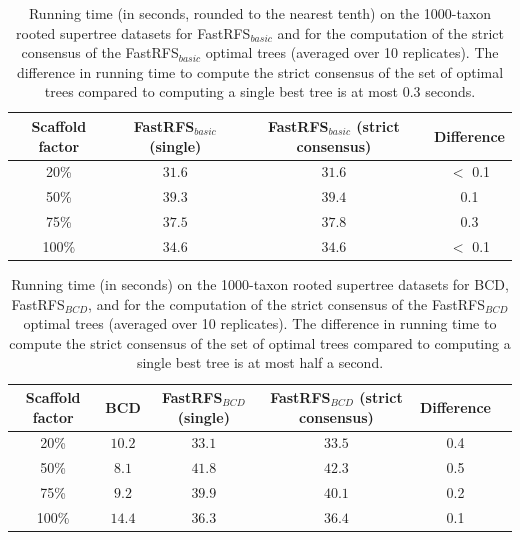 \begin{table}

\caption[Comparison of running times for FastRFS$_{basic}$ with and without SIESTA]{Running time (in seconds, rounded to the nearest tenth) on the 1000-taxon rooted supertree datasets for FastRFS$_{basic}$ and for the computation of the strict consensus of the
FastRFS$_{basic}$ optimal trees (averaged over 10 replicates).  The difference in running time to compute the strict consensus of the set of optimal trees compared to computing a single best tree is at most $0.3$ seconds. }
\begin{tabular}{|c|c|c|c|}
\hline
Scaffold factor & FastRFS$_{basic}$ (single)  & FastRFS$_{basic}$ (strict consensus)& Difference\\
\hline
\hline
 20\%  &$31.6$       &$31.6$ & $<$ 0.1\\
50\% &$39.3$       &$39.4$ & 0.1\\ 
75\% &$37.5$       &$37.8$ & 0.3 \\
100\% &$34.6$       &$34.6$ & $<$ 0.1\\
\hline
\end{tabular}
\label{siesta::table:runningtime-FastRFS$_{basic}$}
\end{table}

\begin{table}
\caption[Running times for BCD and for FastRFS$_{BCD}$ with and without SIESTA]{Running time (in seconds) on the 1000-taxon rooted supertree datasets for  BCD, FastRFS$_{BCD}$, and for the computation of the strict consensus of the
FastRFS$_{BCD}$ optimal trees (averaged over 10 replicates). The difference in running time to compute the strict consensus of the set of optimal trees compared to computing a single best tree is at most half a second.}
\begin{tabular}{|c|c|c|c|c|c|}
\hline
 Scaffold factor & BCD & FastRFS$_{BCD}$ (single)  & FastRFS$_{BCD}$ (strict consensus)& Difference\\
\hline
\hline 
20\% &$10.2$       &$33.1$       &$33.5$ & 0.4 \\
50\%  &$8.1$        &$41.8$       &$42.3$ & 0.5 \\ 
75\% &$9.2$        &$39.9$       &$40.1$ &0.2 \\
100\% &$14.4$       &$36.3$       &$36.4$ &  0.1\\
\hline
\end{tabular}
\label{siesta::table:runningtime-fastrfs-bcd}
\end{table}
